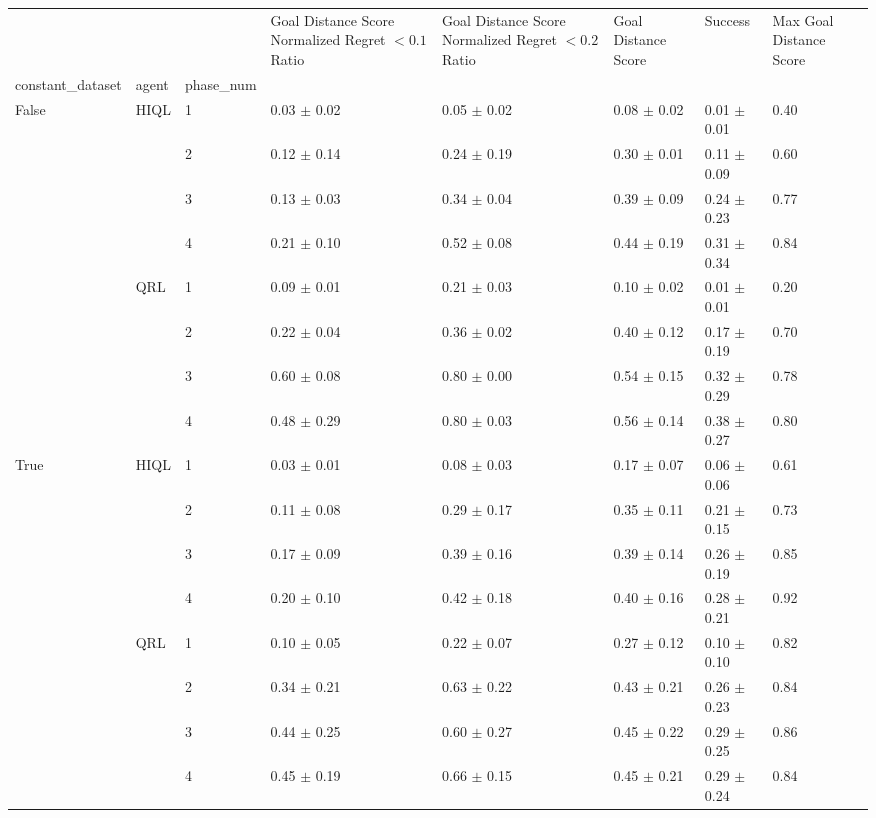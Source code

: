 \begin{tabular}{llllllll}
\toprule
 &  &  & Goal Distance Score Normalized Regret $< 0.1$ Ratio & Goal Distance Score Normalized Regret $< 0.2$ Ratio & Goal Distance Score & Success & Max Goal Distance Score \\
constant_dataset & agent & phase_num &  &  &  &  &  \\
\midrule
\multirow[t]{8}{*}{False} & \multirow[t]{4}{*}{HIQL} & 1 & 0.03 $\pm$ 0.02 & 0.05 $\pm$ 0.02 & 0.08 $\pm$ 0.02 & 0.01 $\pm$ 0.01 & 0.40 \\
 &  & 2 & 0.12 $\pm$ 0.14 & 0.24 $\pm$ 0.19 & 0.30 $\pm$ 0.01 & 0.11 $\pm$ 0.09 & 0.60 \\
 &  & 3 & 0.13 $\pm$ 0.03 & 0.34 $\pm$ 0.04 & 0.39 $\pm$ 0.09 & 0.24 $\pm$ 0.23 & 0.77 \\
 &  & 4 & 0.21 $\pm$ 0.10 & 0.52 $\pm$ 0.08 & 0.44 $\pm$ 0.19 & 0.31 $\pm$ 0.34 & 0.84 \\
\cline{2-8}
 & \multirow[t]{4}{*}{QRL} & 1 & 0.09 $\pm$ 0.01 & 0.21 $\pm$ 0.03 & 0.10 $\pm$ 0.02 & 0.01 $\pm$ 0.01 & 0.20 \\
 &  & 2 & 0.22 $\pm$ 0.04 & 0.36 $\pm$ 0.02 & 0.40 $\pm$ 0.12 & 0.17 $\pm$ 0.19 & 0.70 \\
 &  & 3 & 0.60 $\pm$ 0.08 & 0.80 $\pm$ 0.00 & 0.54 $\pm$ 0.15 & 0.32 $\pm$ 0.29 & 0.78 \\
 &  & 4 & 0.48 $\pm$ 0.29 & 0.80 $\pm$ 0.03 & 0.56 $\pm$ 0.14 & 0.38 $\pm$ 0.27 & 0.80 \\
\cline{1-8} \cline{2-8}
\multirow[t]{8}{*}{True} & \multirow[t]{4}{*}{HIQL} & 1 & 0.03 $\pm$ 0.01 & 0.08 $\pm$ 0.03 & 0.17 $\pm$ 0.07 & 0.06 $\pm$ 0.06 & 0.61 \\
 &  & 2 & 0.11 $\pm$ 0.08 & 0.29 $\pm$ 0.17 & 0.35 $\pm$ 0.11 & 0.21 $\pm$ 0.15 & 0.73 \\
 &  & 3 & 0.17 $\pm$ 0.09 & 0.39 $\pm$ 0.16 & 0.39 $\pm$ 0.14 & 0.26 $\pm$ 0.19 & 0.85 \\
 &  & 4 & 0.20 $\pm$ 0.10 & 0.42 $\pm$ 0.18 & 0.40 $\pm$ 0.16 & 0.28 $\pm$ 0.21 & 0.92 \\
\cline{2-8}
 & \multirow[t]{4}{*}{QRL} & 1 & 0.10 $\pm$ 0.05 & 0.22 $\pm$ 0.07 & 0.27 $\pm$ 0.12 & 0.10 $\pm$ 0.10 & 0.82 \\
 &  & 2 & 0.34 $\pm$ 0.21 & 0.63 $\pm$ 0.22 & 0.43 $\pm$ 0.21 & 0.26 $\pm$ 0.23 & 0.84 \\
 &  & 3 & 0.44 $\pm$ 0.25 & 0.60 $\pm$ 0.27 & 0.45 $\pm$ 0.22 & 0.29 $\pm$ 0.25 & 0.86 \\
 &  & 4 & 0.45 $\pm$ 0.19 & 0.66 $\pm$ 0.15 & 0.45 $\pm$ 0.21 & 0.29 $\pm$ 0.24 & 0.84 \\
\cline{1-8} \cline{2-8}
\bottomrule
\end{tabular}
